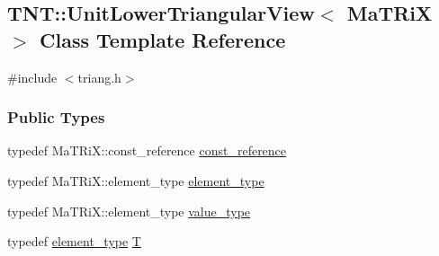 \subsection{TNT::UnitLowerTriangularView$<$ MaTRiX $>$ Class Template Reference}
\label{class_t_n_t_1_1_unit_lower_triangular_view}


{\ttfamily \#include $<$triang.h$>$}

\subsubsection*{Public Types}
\begin{DoxyCompactItemize}
\item 
typedef MaTRiX::const\_\-reference \hyperlink{class_t_n_t_1_1_unit_lower_triangular_view_a7792363220cbf3c2d5264a01f66b4c70}{const\_\-reference}
\item 
typedef MaTRiX::element\_\-type \hyperlink{class_t_n_t_1_1_unit_lower_triangular_view_aa07ec709dc10cc1a022bfabbf6dfebd5}{element\_\-type}
\item 
typedef MaTRiX::element\_\-type \hyperlink{class_t_n_t_1_1_unit_lower_triangular_view_a4347f1df7b282c34c44e4b380c7b8f53}{value\_\-type}
\item 
typedef \hyperlink{class_t_n_t_1_1_unit_lower_triangular_view_aa07ec709dc10cc1a022bfabbf6dfebd5}{element\_\-type} \hyperlink{class_t_n_t_1_1_unit_lower_triangular_view_aae2b7bbd9893cb1b1b2152ba1bab4111}{T}
\end{DoxyCompactItemize}
